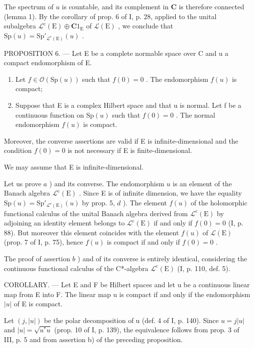 The spectrum of \(u\) is countable, and its complement in \(\mathbf{C}\) is therefore connected (lemma 1). By the corollary of prop. 6 of I, p. 28, applied to the unital subalgebra \(\mathcal{L}^{\mathrm{c}}(\mathrm{E})\oplus \mathbf{C}1_{\mathrm{E}}\) of \(\mathcal{L}(\mathrm{E})\) , we conclude that \(\mathrm{Sp}(u) = \mathrm{Sp}'_{\mathcal{L}^{\mathrm{c}}(\mathrm{E})}(u)\) .

PROPOSITION 6. --- Let E be a complete normable space over C and u a compact endomorphism of E.

\begin{enumerate}
\def\labelenumi{\alph{enumi})}
\item
  Let \(f \in \mathcal{O}(\mathrm{Sp}(u))\) such that \(f(0) = 0\) . The endomorphism \(f(u)\) is compact;
\item
  Suppose that E is a complex Hilbert space and that u is normal. Let f be a continuous function on \(\mathrm{Sp}(u)\) such that \(f(0)=0\) . The normal endomorphism \(f(u)\) is compact.
\end{enumerate}

Moreover, the converse assertions are valid if E is infinite-dimensional and the condition \(f(0) = 0\) is not necessary if E is finite-dimensional.

We may assume that E is infinite-dimensional.

Let us prove \(a\) ) and its converse. The endomorphism \(u\) is an element of the Banach algebra \(\mathcal{L}^{\mathrm{c}}(\mathrm{E})\) . Since E is of infinite dimension, we have the equality \(\mathrm{Sp}(u) = \mathrm{Sp}'_{\mathcal{L}^{\mathrm{c}}(\mathrm{E})}(u)\) by prop. 5, \(d\) ). The element \(f(u)\) of the holomorphic functional calculus of the unital Banach algebra derived from \(\mathcal{L}^{\mathrm{c}}(\mathrm{E})\) by adjoining an identity element belongs to \(\mathcal{L}^{\mathrm{c}}(\mathrm{E})\) if and only if \(f(0) = 0\) (I, p. 88). But moreover this element coincides with the element \(f(u)\) of \(\mathcal{L}(\mathrm{E})\) (prop. 7 of I, p. 75), hence \(f(u)\) is compact if and only if \(f(0) = 0\) .

The proof of assertion \(b\) ) and of its converse is entirely identical, considering the continuous functional calculus of the C*-algebra \(\mathcal{L}^{\mathrm{c}}(\mathrm{E})\) (I, p. 110, def. 5).

COROLLARY. --- Let E and F be Hilbert spaces and let u be a continuous linear map from E into F. The linear map u is compact if and only if the endomorphism \(|u|\) of E is compact.

Let \((j, |u|)\) be the polar decomposition of u (def. 4 of I, p. 140). Since \(u = j|u|\) and \(|u| = \sqrt{u^{*}u}\) (prop. 10 of I, p. 139), the equivalence follows from prop. 3 of III, p. 5 and from assertion b) of the preceding proposition.


